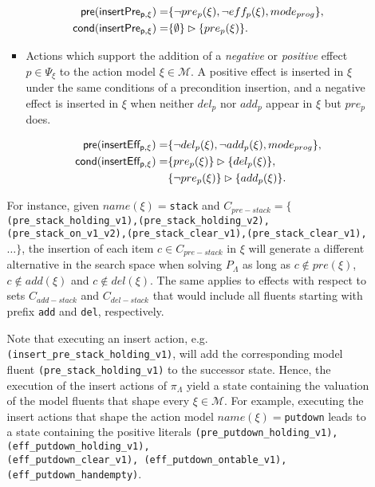 \documentclass[runningheads]{llncs}
\newcommand{\pre}{\mathsf{pre}}     %
\newcommand{\cond}{\mathsf{cond}}   %
\begin{document}
\begin{itemize}
\begin{enumerate}
\begin{itemize}
\begin{small}
\begin{align*}
\hspace*{7pt}\pre(\mathsf{insertPre_{p,\xi}})=&\{\neg pre_{p}(\xi), \neg eff_{p}(\xi), mode_{prog}\},\\
\cond(\mathsf{insertPre_{p,\xi}})=&\{\emptyset\}\rhd\{pre_{p}(\xi)\}.
\end{align*}
\end{small}

\item Actions which support the addition of a {\em negative} or {\em positive} effect $p\in \Psi_{\xi}$ to the action model $\xi\in\mathcal{M}$. A positive effect is inserted in $\xi$ under the same conditions of a precondition insertion, and a negative effect is inserted in $\xi$ when neither $del_p$ nor $add_p$ appear in $\xi$ but $pre_p$ does.

\begin{small}
\begin{align*}
\hspace*{7pt}\pre(\mathsf{insertEff_{p,\xi}})=&\{\neg del_{p}(\xi),\neg add_{p}(\xi), mode_{prog}\},\\
\cond(\mathsf{insertEff_{p,\xi}})=&\{pre_{p}(\xi)\}\rhd\{del_{p}(\xi)\},\\
& \{\neg pre_{p}(\xi)\}\rhd\{add_{p}(\xi)\}.
\end{align*}
\end{small}
\end{itemize}

For instance, given $name(\xi)=${\tt{\small stack}} and $C_{pre-stack}=\{${\tt{\small (pre\_stack\_holding\_v1),(pre\_stack\_holding\_v2), (pre\_stack\_on\_v1\_v2),(pre\_stack\_clear\_v1),(pre\_stack\_clear\_v1),}}$\ldots \}$, the insertion of each item $c \in C_{pre-stack}$ in $\xi$ will generate a different alternative in the search space when solving $P_{\Lambda}$ as long as $c \notin pre(\xi)$,  $c \notin add(\xi)$ and $c \notin del(\xi)$. The same applies to effects with respect to sets $C_{add-stack}$ and $C_{del-stack}$ that would include all fluents starting with prefix  {\tt{\small add}} and {\tt{\small del}}, respectively.

\vspace{0.1cm}

Note that executing an insert action, e.g.{\tt{\small (insert\_pre\_stack\_holding\_v1)}}, will add the corresponding model fluent {\tt{\small (pre\_stack\_holding\_v1)}} to the successor state. Hence, the execution of the insert actions of $\pi_\Lambda$ yield a state containing the valuation of the model fluents that shape every $\xi \in \mathcal{M}$. For example, executing the insert actions that shape the action model $name(\xi)=${\tt{\small putdown}} leads to a state containing the positive literals {\tt{\small (pre\_putdown\_holding\_v1),(eff\_putdown\_holding\_v1),\\ (eff\_putdown\_clear\_v1),
(eff\_putdown\_ontable\_v1),(eff\_putdown\_handempty)}}.


\end{enumerate}
\end{itemize}
\end{document}
